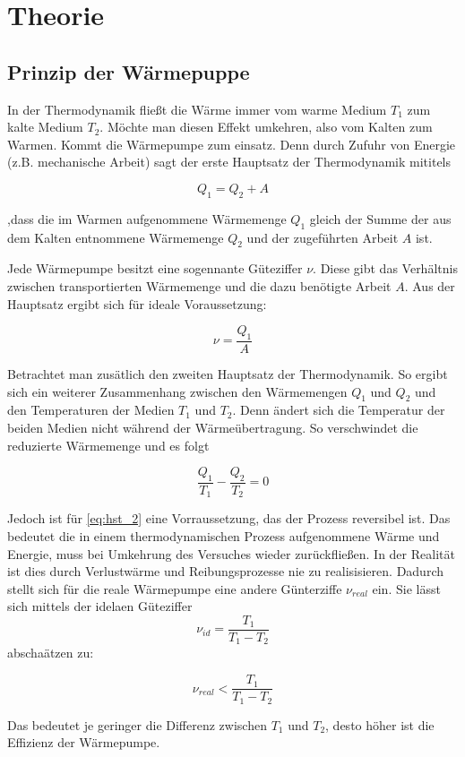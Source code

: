 \section{Theorie}

\subsection{Prinzip der Wärmepuppe}

In der Thermodynamik fließt die Wärme immer 
vom warme Medium $T_1$ zum kalte Medium $T_2$.
Möchte man diesen Effekt umkehren, also vom Kalten 
zum Warmen. Kommt die Wärmepumpe zum einsatz.
Denn durch Zufuhr von Energie (z.B. mechanische Arbeit) sagt der erste 
Hauptsatz der Thermodynamik mititels

\begin{equation}
\label{eq:hst_1}
Q_1=Q_2+A
\end{equation}

,dass die im Warmen aufgenommene Wärmemenge $Q_1$ gleich 
der Summe der aus dem Kalten entnommene Wärmemenge $Q_2$
und der zugeführten Arbeit $A$ ist.

Jede Wärmepumpe besitzt eine sogennante Güteziffer $\nu$.
Diese gibt das Verhältnis zwischen transportierten Wärmemenge 
und die dazu benötigte Arbeit $A$.
Aus der Hauptsatz ergibt sich für ideale Voraussetzung:

\begin{equation*}
\nu=\frac{Q_1}{A}
\end{equation*}

Betrachtet man zusätlich den zweiten Hauptsatz der Thermodynamik.
So ergibt sich ein weiterer Zusammenhang zwischen den Wärmemengen 
$Q_1$ und $Q_2$ und den Temperaturen der Medien $T_1$ und $T_2$.
Denn ändert sich die Temperatur der beiden Medien nicht während der 
Wärmeübertragung. 
So verschwindet die reduzierte Wärmemenge und es folgt

\begin{equation}
\label{eq:hst_2}
\frac{Q_1}{T_1}-\frac{Q_2}{T_2}=0
\end{equation}

Jedoch ist für \eqref{eq:hst_2} eine Vorraussetzung,
das der Prozess reversibel ist.
Das bedeutet die in einem thermodynamischen Prozess aufgenommene Wärme 
und Energie, muss bei Umkehrung des Versuches wieder zurückfließen.
In der Realität ist dies durch Verlustwärme und Reibungsprozesse
nie zu realisisieren.
Dadurch stellt sich für die reale Wärmepumpe eine andere 
Günterziffe $\nu_{real}$ ein. 
Sie lässt sich mittels der idelaen Güteziffer 
\begin{equation*}
\nu_{id}=\frac{T_1}{T_1-T_2}
\end{equation*}
abschaätzen zu:

\begin{equation*}
\nu_{real}<\frac{T_1}{T_1-T_2}
\end{equation*}

Das bedeutet je geringer die Differenz zwischen $T_1$ und $T_2$, 
desto höher ist die Effizienz der Wärmepumpe.

